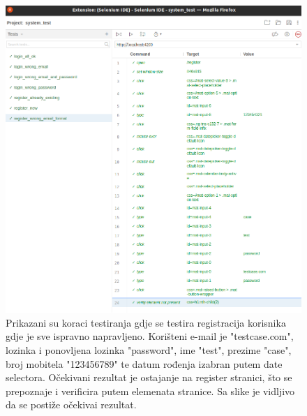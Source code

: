             \begin{figure}[H]
                \includegraphics[width=\textwidth]{slike/tests_system/register_wrong_format.png} %
                \caption{Prikazani su koraci testiranja gdje se testira registracija korisnika gdje je sve ispravno napravljeno. Korišteni e-mail je "testcase.com", lozinka i ponovljena lozinka "password", ime "test", prezime "case", broj mobitela "123456789" te datum rođenja izabran putem date selectora. Očekivani rezultat je ostajanje na register stranici, što se prepoznaje i verificira putem elemenata stranice. Sa slike je vidljivo da se postiže očekivai rezultat.}
                \label{fig:struktura} %
            \end{figure}

